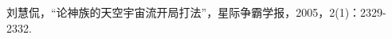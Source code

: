 
\begin{publications}
\renewcommand{\currentchapter}{附录1 攻读学位期间发表论文目录}
\item 刘慧侃，“论神族的天空宇宙流开局打法”，星际争霸学报，2005，2(1)：2329-2332.

\end{publications}
